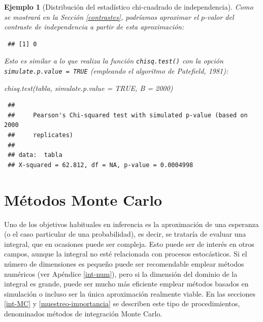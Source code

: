 \documentclass[
]{book}
\newenvironment{Shaded}{\begin{snugshade}}{\end{snugshade}}
\newcommand{\AttributeTok}[1]{\textcolor[rgb]{0.77,0.63,0.00}{#1}}
\newcommand{\ConstantTok}[1]{\textcolor[rgb]{0.00,0.00,0.00}{#1}}
\newcommand{\DecValTok}[1]{\textcolor[rgb]{0.00,0.00,0.81}{#1}}
\newcommand{\FunctionTok}[1]{\textcolor[rgb]{0.00,0.00,0.00}{#1}}
\newcommand{\NormalTok}[1]{#1}
\newcommand{\OtherTok}[1]{\textcolor[rgb]{0.56,0.35,0.01}{#1}}
\newcommand{\SpecialCharTok}[1]{\textcolor[rgb]{0.00,0.00,0.00}{#1}}
\theoremstyle{break}
\newtheorem{example}{Ejemplo}[chapter]
\theoremstyle{nonumberplain}
\begin{document}
\begin{example}[Distribución del estadístico chi-cuadrado de independencia]
Como se mostrará en la Sección \ref{contrastes}, podríamos aproximar el \(p\)-valor del contraste de independencia a partir de esta aproximación:

\begin{Shaded}
\end{Shaded}

\begin{verbatim}
 ## [1] 0
\end{verbatim}

Esto es similar a lo que realiza la función \texttt{chisq.test()} con la opción \texttt{simulate.p.value\ =\ TRUE} (empleando el algoritmo de Patefield, 1981):

\begin{Shaded}
\begin{Highlighting}[]
\FunctionTok{chisq.test}\NormalTok{(tabla, }\AttributeTok{simulate.p.value =} \ConstantTok{TRUE}\NormalTok{, }\AttributeTok{B =} \DecValTok{2000}\NormalTok{)}
\end{Highlighting}
\end{Shaded}

\begin{verbatim}
 ## 
 ##     Pearson's Chi-squared test with simulated p-value (based on 2000
 ##     replicates)
 ## 
 ## data:  tabla
 ## X-squared = 62.812, df = NA, p-value = 0.0004998
\end{verbatim}

\end{example}

\hypertarget{monte-carlo}{%
\chapter{Métodos Monte Carlo}\label{monte-carlo}}

Uno de los objetivos habituales en inferencia es la aproximación de una esperanza (o el caso particular de una probabilidad), es decir, se trataría de evaluar una integral, que en ocasiones puede ser compleja.
Esto puede ser de interés en otros campos, aunque la integral no esté relacionada con procesos estocásticos.
Si el número de dimensiones es pequeño puede ser recomendable emplear métodos numéricos (ver Apéndice \ref{int-num}), pero si la dimensión del dominio de la integral es grande, puede ser mucho más eficiente emplear métodos basados en simulación o incluso ser la única aproximación realmente viable.
En las secciones \ref{int-MC} y \ref{muestreo-importancia} se describen este tipo de procedimientos, denominados métodos de integración Monte Carlo.
\end{document}
